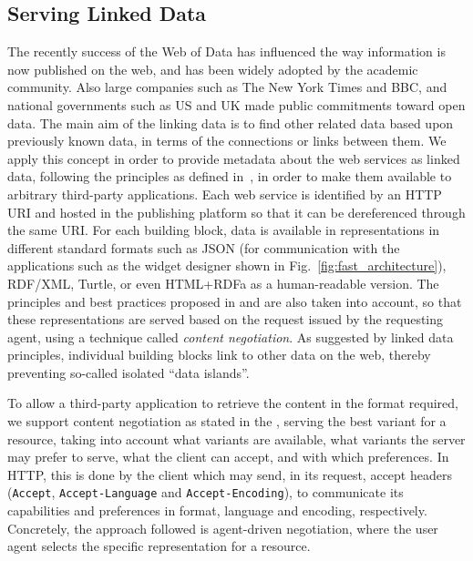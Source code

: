 
\subsection{Serving Linked Data} %
\label{sub:linked_data}

The recently success of the Web of Data has influenced the way information is now published on the web, and has been widely adopted by the academic community. Also large companies such as The New York Times and BBC, and national governments such as US and UK made public commitments toward open data. The main aim of the linking data is to find other related data based upon previously known data, in terms of the connections or links between them. We apply this concept in order to provide metadata about the web services as linked data, following the principles as defined in~\cite{bizer_ijswis2009}, in order to make them available to arbitrary third-party applications. Each web service is identified by an HTTP URI and hosted in the publishing platform so that it can be dereferenced through the same URI. For each building block, data is available in representations in different standard formats such as JSON (for communication with the applications such as the widget designer shown in Fig.~\ref{fig:fast_architecture}), RDF/XML, Turtle, or even HTML+RDFa as a human-readable version. The principles and best practices proposed in \cite{berrueta2008} and \cite{sauermann2008cool_uris} are also taken into account, so that these representations are served based on the request issued by the requesting agent, using a technique called \emph{content negotiation}. As suggested by linked data principles, individual building blocks link to other data on the web, thereby preventing so-called isolated ``data islands''.

To allow a third-party application to retrieve the content in the format required, we support content negotiation as stated in the \cite{http1.1}, serving the best variant for a resource, taking into account what variants are available, what variants the server may prefer to serve, what the client can accept, and with which preferences. In HTTP, this is done by the client which may send, in its request, accept headers (\texttt{Accept}, \texttt{Accept-Language} and \texttt{Accept-Encoding}), to communicate its capabilities and preferences in format, language and encoding, respectively. Concretely, the approach followed is agent-driven negotiation, where the user agent selects the specific representation for a resource.
